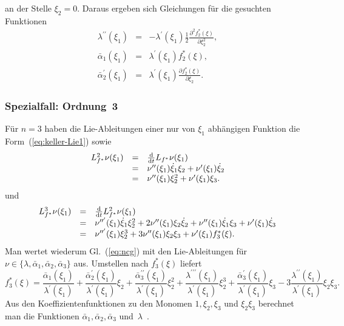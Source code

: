  an der Stelle $\xi_{2}=0$. Daraus ergeben sich Gleichungen für die
gesuchten Funktionen 
\begin{equation}
\begin{array}{lcl}
\lambda^{\prime\prime}(\xi_{1}) & = & -\lambda^{\prime}(\xi_{1})\frac{1}{2}\frac{\partial^{2}f_{2}^{*}(\xi)}{\partial\xi_{2}^{2}},\\
\bar{\alpha}_{1}(\xi_{1}) & = & \lambda^{\prime}(\xi_{1})f_{2}^{*}(\xi),\\
\bar{\alpha}_{2}^{\prime}(\xi_{1}) & = & \lambda^{\prime}(\xi_{1})\frac{\partial f_{2}^{*}(\xi)}{\partial\xi_{2}}.
\end{array}\label{eq:Keller-Funktionen-n2}
\end{equation}


\subsubsection*{Spezialfall: Ordnung~3}

Für $n=3$ haben die Lie-Ableitungen einer nur von $\xi_{1}$ abhängigen
Funktion die Form~(\ref{eq:keller-Lie1}) sowie
\[
\begin{array}{lcl}
L_{f^{*}}^{2}\nu(\xi_{1}) & = & \frac{{\mathrm{d}}}{{\mathrm{d}} t}L_{f^{*}}\nu(\xi_{1})\\
 & = & \nu^{\prime\prime}(\xi_{1})\dot{\xi}_{1}\xi_{2}+\nu^{\prime}(\xi_{1})\dot{\xi}_{2}\\
 & = & \nu^{\prime\prime}(\xi_{1})\xi_{2}^{2}+\nu^{\prime}(\xi_{1})\xi_{3}.
\end{array}
\]
und
\[
\begin{array}{lcl}
L_{f^{*}}^{3}\nu(\xi_{1}) & = & \frac{{\mathrm{d}}}{{\mathrm{d}} t}L_{f^{*}}^{2}\nu(\xi_{1})\\
 & = & \nu^{\prime\prime^{\prime}}(\xi_{1})\dot{\xi}_{1}\xi_{2}^{2}+2\nu^{\prime\prime}(\xi_{1})\xi_{2}\dot{\xi}_{2}+\nu^{\prime\prime}(\xi_{1})\dot{\xi}_{1}\xi_{3}+\nu^{\prime}(\xi_{1})\dot{\xi}_{3}\\
 & = & \nu^{\prime\prime^{\prime}}(\xi_{1})\xi_{2}^{3}+3\nu^{\prime\prime}(\xi_{1})\xi_{2}\xi_{3}+\nu^{\prime}(\xi_{1})f_{3}^{*}(\xi).
\end{array}
\]
Man wertet wiederum Gl.~(\ref{eq:ncg}) mit den Lie-Ableitungen für
$\nu\in\{\lambda,\bar{\alpha}_{1},\bar{\alpha}_{2},\bar{\alpha}_{3}\}$
aus. Umstellen nach $f_{3}^{*}(\xi)$ liefert
\[
f_{3}^{*}(\xi)\!=\!\frac{\bar{\alpha}_{1}(\xi_{1})}{\lambda^{\prime}(\xi_{1})}\!+\!\frac{\bar{\alpha}_{2}^{\prime}(\xi_{1})}{\lambda^{\prime}(\xi_{1})}\xi_{2}\!+\!\frac{\bar{\alpha}_{3}^{\prime\prime}(\xi_{1})}{\lambda^{\prime}(\xi_{1})}\xi_{2}^{2}\!+\!\frac{\lambda^{\prime\prime\prime}(\xi_{1})}{\lambda^{\prime}(\xi_{1})}\xi_{2}^{3}\!+\!\frac{\bar{\alpha}_{3}^{\prime}(\xi_{1})}{\lambda^{\prime}(\xi_{1})}\xi_{3}\!-\!3\frac{\lambda^{\prime\prime}(\xi_{1})}{\lambda^{\prime}(\xi_{1})}\xi_{2}\xi_{3}.
\]
Aus den Koeffizientenfunktionen zu den Monomen $1,\xi_{2},\xi_{3}$
und $\xi_{2}\xi_{3}$ berechnet man die Funktionen $\bar{\alpha}_{1},\bar{\alpha}_{2},\bar{\alpha}_{3}$
und~$\lambda$~\cite{jelali1995bericht}.

